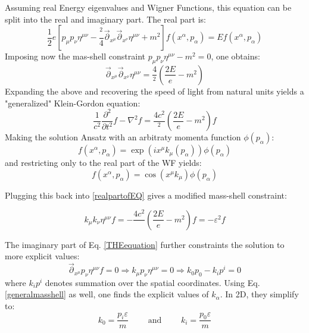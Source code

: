\documentclass[twoside,a4paper,11pt]{article}
\numberwithin{equation}{section}
\newcommand{\parr}{\overset{\rightarrow}{\partial}}
\begin{document}
Assuming real Energy eigenvalues and Wigner Functions, this equation can be split into the real and imaginary part. The real part is:
\begin{equation}
    \frac{1}{2}e \left[ p_\mu p_\nu \eta^{\mu\nu}  - \frac{ ^2}{4}\parr_{x^\mu}\parr_{x^\nu} \eta^{\mu\nu} + m^2 \right] f \left(x^\alpha,p_\alpha \right) = E f\left(x^\alpha,p_\alpha \right)
\end{equation}
Imposing now the mas-shell constraint $p_\mu p_\nu \eta^{\mu\nu} - m^2 = 0$, one obtains:
\begin{equation}
    \parr_{x^\mu}\parr_{x^\nu} \eta^{\mu\nu} = \frac{4}{ ^2} \left( \frac{2E}{e} - m^2 \right)
\end{equation}
Expanding the above and recovering the speed of light from natural units yields a "generalized" Klein-Gordon equation:
\begin{equation}
    \frac{1}{c^2}\frac{\partial^2}{\partial t^2} f - \nabla ^2 f = \frac{4 c^2}{ ^2} \left( \frac{2E}{e} - m^2 \right) f
    \label{realpartofEQ}
\end{equation}
Making the solution Ansatz with an arbitraty momenta function $\phi(p_\alpha)$:
\begin{equation}
    f\left(x^\alpha,p_\alpha \right) = \exp (i x^\mu k_\mu (p_\alpha) ) \phi(p_\alpha)
\end{equation}
and restricting only to the real part of the WF yields:
\begin{equation}
    f\left(x^\alpha,p_\alpha \right) = \cos (x^\mu k_\mu ) \phi(p_\alpha)
\end{equation}

Plugging this back into \ref{realpartofEQ} gives a modified mass-shell constraint:

\begin{equation}
    k_\mu k_\nu \eta^{\mu\nu} f = - \frac{4 c^2}{ } \left( \frac{2E}{e} - m^2 \right) f = -\varepsilon^2 f
    \label{generalmasshell}
\end{equation}

The imaginary part of Eq. \ref{THEequation} further constraints the solution to more explicit values:
\begin{equation}
     \parr_{x^\mu} p_\nu \eta^{\mu\nu} f = 0 \Rightarrow k_\mu p_\nu \eta^{\mu\nu}  = 0 \Rightarrow k_0 p_0 - k_i p^i = 0
\end{equation}
where $k_i p^i$ denotes summation over the spatial coordinates. Using Eq. \ref{generalmasshell} as well, one finds the explicit values of $k_\alpha$. In 2D, they simplify to:
\begin{equation}
k_0 = \frac{p_i \varepsilon}{m} \qquad \text{ and } \qquad k_i = \frac{p_0 \varepsilon}{m}
\end{equation}
\end{document}
